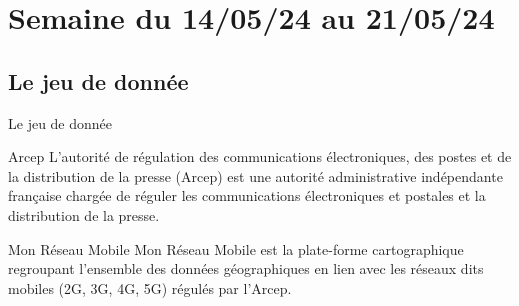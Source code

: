 \smallframetitle

\section{Semaine du 14/05/24 au 21/05/24}
\insertsectionframe
\subsection{Le jeu de donnée}
\insertsubsectionframe

\begin{frame}{Le jeu de donnée}
    \begin{block}{Arcep}
        L'autorité de régulation des communications électroniques, des postes et de la distribution de la presse (Arcep) est une autorité administrative indépendante française chargée de réguler les communications électroniques et postales et la distribution de la presse.
    \end{block}

    \begin{block}{Mon Réseau Mobile}
        Mon Réseau Mobile est la plate-forme cartographique regroupant l’ensemble des données géographiques en lien avec les réseaux dits \og mobiles \fg{} (2G, 3G, 4G, 5G) régulés par l’Arcep.
    \end{block}
\end{frame}


